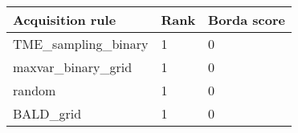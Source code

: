 \begin{tabular}{lll}
Acquisition rule & Rank & Borda score \\ 
\hline 
TME_sampling_binary & 1 & 0 \\ 
maxvar_binary_grid & 1 & 0 \\ 
random & 1 & 0 \\ 
BALD_grid & 1 & 0 \\ 
\hline 
\end{tabular}